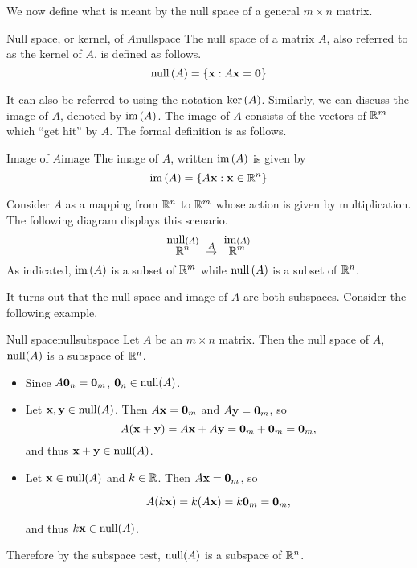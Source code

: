 We now define what is meant by the null space of a general $m\times n$ matrix.

\begin{definition}{Null space, or kernel, of $A$}{nullspace}
The null space of a matrix $A$, also referred to as the kernel of $A$, 
is defined as follows.%
\begin{equation*}
\mbox{null} \left(A\right) =\left\{{\bf x} :A {\bf x} ={\bf 0}\right\}
\end{equation*}
\end{definition}

It can also be referred to using the notation $\ker \left(
A\right) $. 
Similarly, we can discuss the image of $A$, denoted by
$\mbox{im}\left(A\right)$. The image of $A$ consists of the vectors
of $\mathbb{R}^{m}$ which ``get hit'' by $A$.  The formal definition
is as follows.

\begin{definition}{Image of $A$}{image}
The image of $A$, written $\mbox{im}\left(A\right)$ is given by
\[
\mbox{im}\left(A \right) = \left\{A{\bf x} : {\bf x} \in \mathbb{R}^n \right\}
\]
\end{definition}

Consider
$A$ as a mapping from $\mathbb{R}^{n}$ to $\mathbb{R}^{m}$ whose action is given by multiplication. The following diagram displays this scenario. 
\begin{equation*}
\overset{\func{null} \tup{A} }{\R^{n}}\ \overset{A}{\rightarrow }\ 
\overset{
\func{im}\tup{A} }{\R^{m}}
\end{equation*}
As indicated, $\mbox{im}\left(A\right) $ is a subset of $\mathbb{R}^{m}$
while $\mbox{null} \left(A\right) $ is a subset of $\mathbb{R}^{n}$.

It turns out that the null space and image of $A$ are both subspaces. Consider the following example.

\begin{example}{Null space}{nullsubspace}
Let $A$ be an $m\times n$ matrix. Then the null space of $A$, $\mbox{null}(A)$ is 
a subspace of $\mathbb{R}^n$.
\end{example}

\begin{solution}
\begin{itemize}
\item Since $A{\bf 0}_n={\bf 0}_m$, 
${\bf 0}_n\in\mbox{null}(A)$.

\item Let ${\bf x},{\bf y}\in\mbox{null}(A)$. 
Then $A{\bf x}={\bf 0}_m$ and $A{\bf y}={\bf 0}_m$, so
\[ A({\bf x}+{\bf y})=A{\bf x}+A{\bf y} = {\bf 0}_m+{\bf 0}_m={\bf 0}_m,\]
and thus ${\bf x}+{\bf y}\in\mbox{null}(A)$.
\item Let ${\bf x}\in\mbox{null}(A)$ and $k\in\mathbb{R}$.
Then $A{\bf x}={\bf 0}_m$, so

\[ A(k{\bf x}) = k(A{\bf x})=k{\bf 0}_m={\bf 0}_m,\]

and thus $k{\bf x}\in\mbox{null}(A)$.
\end{itemize}
Therefore by the subspace test, $\mbox{null}(A)$ is a subspace of $\mathbb{R}^n$.

\end{solution}

